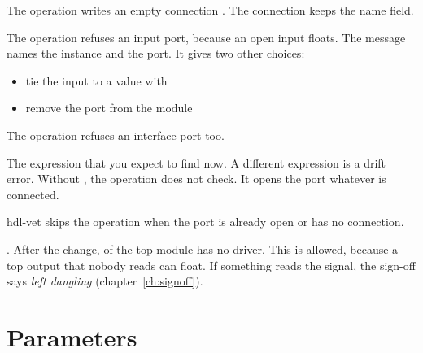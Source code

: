 \begin{entry}{}
\item[Writes] The operation writes an empty connection . The connection
  keeps the name field.
\item[Refused] The operation refuses an input port, because an open input floats. The
  message names the instance and the port. It gives two other choices:
  \begin{itemize}
  \item tie the input to a value with 
  \item remove the port from the module
  \end{itemize}
  The operation refuses an interface port too.
\item[was] The expression that you expect to find now. A different expression is a drift
  error. Without , the operation does not check. It opens the port whatever is
  connected.
\item[Again] hdl-vet skips the operation when the port is already open or has no connection.
\item[Example] . After the change,  of the top
  module has no driver. This is allowed, because a top output that nobody reads can float.
  If something reads the signal, the sign-off says \emph{left dangling}
  (chapter~\ref{ch:signoff}).
\end{entry}



\section{Parameters}

